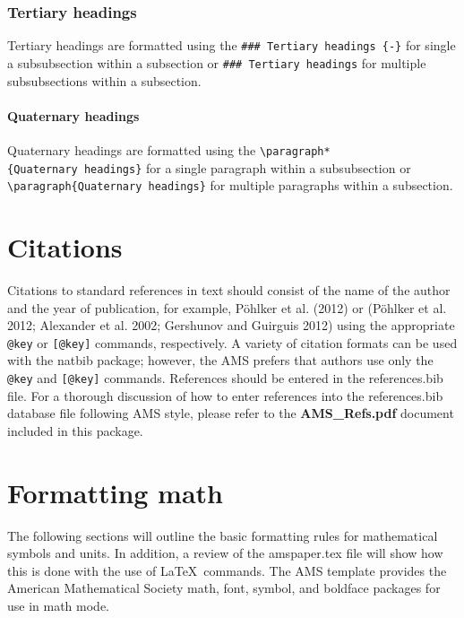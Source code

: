 \documentclass[draft]{ametsoc}
\begin{document}
\subsubsection*{Tertiary headings}\label{tertiary-headings}

Tertiary headings are formatted using the
\texttt{\#\#\#\ Tertiary\ headings\ \{-\}} for single a subsubsection
within a subsection or \texttt{\#\#\#\ Tertiary\ headings} for multiple
subsubsections within a subsection.

\paragraph*{Quaternary headings}

Quaternary headings are formatted using the
\texttt{\textbackslash{}paragraph*\{Quaternary\ headings\}} for a single
paragraph within a subsubsection or
\texttt{\textbackslash{}paragraph\{Quaternary\ headings\}} for multiple
paragraphs within a subsection.

\section{Citations}\label{citations}

Citations to standard references in text should consist of the name of
the author and the year of publication, for example, Pöhlker et al.
(2012) or (Pöhlker et al. 2012; Alexander et al. 2002; Gershunov and
Guirguis 2012) using the appropriate \texttt{@key} or
\texttt{{[}@key{]}} commands, respectively. A variety of citation
formats can be used with the natbib package; however, the AMS prefers
that authors use only the \texttt{@key} and \texttt{{[}@key{]}}
commands. References should be entered in the references.bib file. For a
thorough discussion of how to enter references into the references.bib
database file following AMS style, please refer to the
\textbf{AMS\_Refs.pdf} document included in this package.

\section{Formatting math}\label{formatting-math}

The following sections will outline the basic formatting rules for
mathematical symbols and units. In addition, a review of the
amspaper.tex file will show how this is done with the use of
\LaTeX~commands. The AMS template provides the American Mathematical
Society math, font, symbol, and boldface packages for use in math mode.
\end{document}

